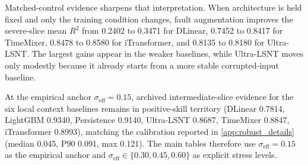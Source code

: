 ﻿\documentclass[review,1p,times]{elsarticle}
\begin{document}
Matched-control evidence sharpens that interpretation. When architecture is held fixed and only the training condition changes, fault augmentation improves the severe-slice mean $R^2$ from 0.2402 to 0.3471 for DLinear, 0.7452 to 0.8417 for TimeMixer, 0.8478 to 0.8580 for iTransformer, and 0.8135 to 0.8180 for Ultra-LSNT. The largest gains appear in the weaker baselines, while Ultra-LSNT moves only modestly because it already starts from a more stable corrupted-input baseline.

At the empirical anchor $\sigma_{\mathrm{eff}}=0.15$, archived intermediate-slice evidence for the six local context baselines remains in positive-skill territory (DLinear 0.7814, LightGBM 0.9340, Persistence 0.9140, Ultra-LSNT 0.8687, TimeMixer 0.8847, iTransformer 0.8993), matching the calibration reported in \ref{app:robust_details} (median 0.045, P90 0.091, max 0.121). The main tables therefore use $\sigma_{\mathrm{eff}}=0.15$ as the empirical anchor and $\sigma_{\mathrm{eff}}\in\{0.30,0.45,0.60\}$ as explicit stress levels.
\end{document}
